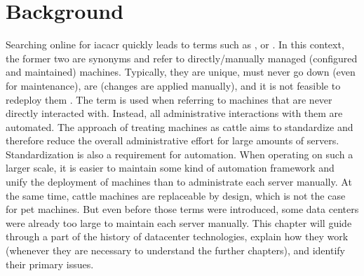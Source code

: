 \chapter{Background}




Searching online for \gls{iacacr} quickly leads to terms such as ,  or  \cite{snowflake_servers}.
In this context, the former two are synonyms and refer to directly/manually managed (configured and maintained) machines. Typically, they are unique, must never go down (even for maintenance), are  (changes are applied manually), and it is not feasible to redeploy them \cite{pets_vs_cattle}. The term  is used when referring to machines that are never directly interacted with. Instead, all administrative interactions with them are automated.
The approach of treating machines as cattle aims to standardize and therefore reduce the overall administrative effort for large amounts of servers. Standardization is also a requirement for automation. When operating on such a larger scale, it is easier to maintain some kind of automation framework and unify the deployment of machines than to administrate each server manually. At the same time, cattle machines are replaceable by design, which is not the case for pet machines.
But even before those terms were introduced, some data centers were already too large to maintain each server manually.
This chapter will guide through a part of the history of datacenter technologies, explain how they work (whenever they are necessary to understand the further chapters), and identify their primary issues.

